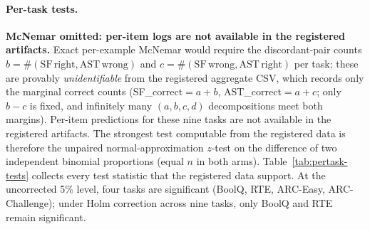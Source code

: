 \documentclass{article}
\begin{document}
\paragraph{Per-task tests.}
\textbf{McNemar omitted: per-item logs are not available in the registered artifacts.}
Exact per-example McNemar would require the discordant-pair counts
$b=\#(\mathrm{SF}\,\text{right},\mathrm{AST}\,\text{wrong})$ and
$c=\#(\mathrm{SF}\,\text{wrong},\mathrm{AST}\,\text{right})$ per task;
these are provably \emph{unidentifiable} from the registered aggregate
CSV, which records only the marginal correct counts
(SF\_correct$=a+b$, AST\_correct$=a+c$; only $b-c$ is fixed, and infinitely
many $(a,b,c,d)$ decompositions meet both margins). Per-item predictions for
these nine tasks are not available in the registered artifacts. The
strongest test computable from the registered data is therefore the unpaired
normal-approximation $z$-test on the difference of two independent binomial
proportions (equal $n$ in both arms). Table~\ref{tab:pertask-tests} collects
every test statistic that the registered data support. At the uncorrected 5\%
level, four tasks are significant (BoolQ, RTE, ARC-Easy, ARC-Challenge); under
Holm correction across nine tasks, only BoolQ and RTE remain significant.
\end{document}
